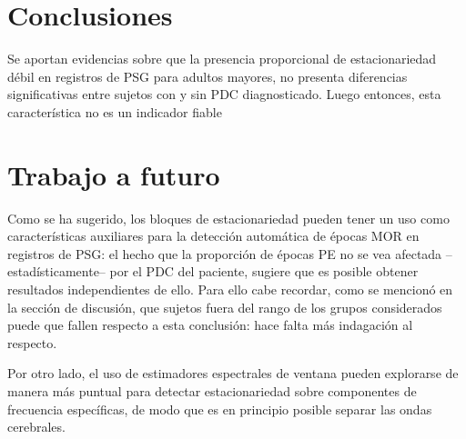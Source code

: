 
\section{Conclusiones}

Se aportan evidencias sobre que la presencia proporcional de estacionariedad d\'ebil en registros 
de PSG para adultos mayores, 
no presenta diferencias significativas entre sujetos con y sin PDC diagnosticado.
Luego entonces, esta caracter\'istica no es un indicador fiable 


\section{Trabajo a futuro}

Como se ha sugerido, los bloques de estacionariedad pueden tener un uso como 
caracter\'isticas auxiliares
para la detecci\'on autom\'atica de \'epocas MOR en registros de PSG: el hecho que la proporci\'on
de \'epocas PE no se vea afectada --estad\'isticamente-- por el PDC del paciente, sugiere que es
posible obtener resultados independientes de ello. Para ello cabe recordar, como se mencion\'o 
en la secci\'on de discusi\'on, que sujetos fuera del rango de los grupos considerados puede
que fallen respecto a esta conclusi\'on: hace falta m\'as indagaci\'on al respecto. 

Por otro lado, el uso de estimadores espectrales de ventana pueden explorarse de manera m\'as
puntual para detectar estacionariedad sobre componentes de frecuencia espec\'ificas, de modo
que es en principio posible separar las ondas cerebrales.

